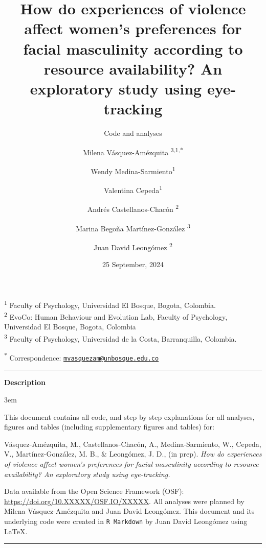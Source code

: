 \documentclass[
  bookmarksnumbered]{article}
\title{How do experiences of violence affect women's preferences for facial masculinity according to resource availability? An exploratory study using eye-tracking}
\subtitle{Code and analyses}
\author{Milena Vásquez-Amézquita \orcidlink{0000-0001-7317-8430}\textsuperscript{3,1,*} \and Wendy Medina-Sarmiento\textsuperscript{1} \and Valentina Cepeda\textsuperscript{1} \and Andrés Castellanos-Chacón \orcidlink{0000-0003-1684-9319}\textsuperscript{2} \and Marina Begoña Martínez-González \orcidlink{0000-0002-5840-6383}\textsuperscript{3} \and Juan David Leongómez \orcidlink{0000-0002-0092-6298}\textsuperscript{2}}
\date{25 September, 2024}
\begin{document}
\maketitle

\textsuperscript{1} Faculty of Psychology, Universidad El Bosque, Bogota, Colombia.\\
\textsuperscript{2} EvoCo: Human Behaviour and Evolution Lab, Faculty of Psychology, Universidad El Bosque, Bogota, Colombia\\
\textsuperscript{3} Faculty of Psychology, Universidad de la Costa, Barranquilla, Colombia.

\textsuperscript{*} Correspondence: \href{mailto:mvasquezam@unbosque.edu.co}{\href{mailto:mvasquezam@unbosque.edu.co}{\nolinkurl{mvasquezam@unbosque.edu.co}}}

\begin{center}\rule{0.5\linewidth}{0.5pt}\end{center}

\begin{center}
\textbf{Description}
\end{center}

\par
\begingroup
\leftskip3em
\rightskip\leftskip

This document contains all code, and step by step explanations for all analyses, figures and tables (including supplementary figures and tables) for:

\begin{hangparas}{.25in}{1}
Vásquez-Amézquita, M., Castellanos-Chacón, A., Medina-Sarmiento, W., Cepeda, V., Martínez-González, M. B., \& Leongómez, J. D.,  (in prep). \textit{How do experiences of violence affect women's preferences for facial masculinity according to resource availability? An exploratory study using eye-tracking.}
\end{hangparas}

Data available from the Open Science Framework (OSF): \url{https://doi.org/10.XXXXX/OSF.IO/XXXXX}. All analyses were planned by Milena Vásquez-Amézquita and Juan David Leongómez. This document and its underlying code were created in \texttt{R\ Markdown} by Juan David Leongómez using \LaTeX.

\begin{center}\rule{0.5\linewidth}{0.5pt}\end{center}

\par
\endgroup

{\hypersetup{hidelinks}
\setcounter{tocdepth}{6}
\tableofcontents
}
\opensupplement
\end{document}
